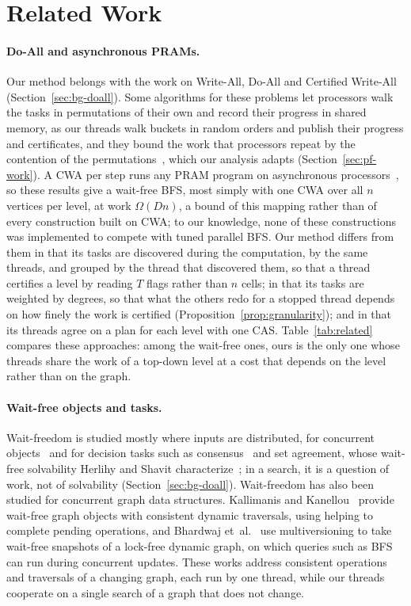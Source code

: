 \section{Related Work}
\label{sec:related}

\paragraph{Do-All and asynchronous PRAMs.} Our method belongs with the work on Write-All, Do-All and Certified Write-All~\cite{kanellakis_robust, georgiou_doall, martel_cwa} (Section~\ref{sec:bg-doall}). Some algorithms for these problems let processors walk the tasks in permutations of their own and record their progress in shared memory, as our threads walk buckets in random orders and publish their progress and certificates, and they bound the work that processors repeat by the contention of the permutations~\cite{anderson_woll_cwa}, which our analysis adapts (Section~\ref{sec:pf-work}). A CWA per step runs any PRAM program on asynchronous processors~\cite{martel_apram, kanellakis_book}, so these results give a wait-free BFS, most simply with one CWA over all $n$ vertices per level, at work $\Omega(Dn)$, a bound of this mapping rather than of every construction built on CWA; to our knowledge, none of these constructions was implemented to compete with tuned parallel BFS. Our method differs from them in that its tasks are discovered during the computation, by the same threads, and grouped by the thread that discovered them, so that a thread certifies a level by reading $T$ flags rather than $n$ cells; in that its tasks are weighted by degrees, so that what the others redo for a stopped thread depends on how finely the work is certified (Proposition~\ref{prop:granularity}); and in that its threads agree on a plan for each level with one CAS. Table~\ref{tab:related} compares these approaches: among the wait-free ones, ours is the only one whose threads share the work of a top-down level at a cost that depends on the level rather than on the graph.

\paragraph{Wait-free objects and tasks.} Wait-freedom is studied mostly where inputs are distributed, for concurrent objects~\cite{herlihy_waitfree, aomp, kogan_fastwf} and for decision tasks such as consensus~\cite{flp} and set agreement, whose wait-free solvability Herlihy and Shavit characterize~\cite{herlihy_shavit_topology}; in a search, it is a question of work, not of solvability (Section~\ref{sec:bg-doall}). Wait-freedom has also been studied for concurrent graph data structures. Kallimanis and Kanellou~\cite{kallimanis_graph} provide wait-free graph objects with consistent dynamic traversals, using helping to complete pending operations, and Bhardwaj et~al.~\cite{graph_snapshots} use multiversioning to take wait-free snapshots of a lock-free dynamic graph, on which queries such as BFS can run during concurrent updates. These works address consistent operations and traversals of a changing graph, each run by one thread, while our threads cooperate on a single search of a graph that does not change.

